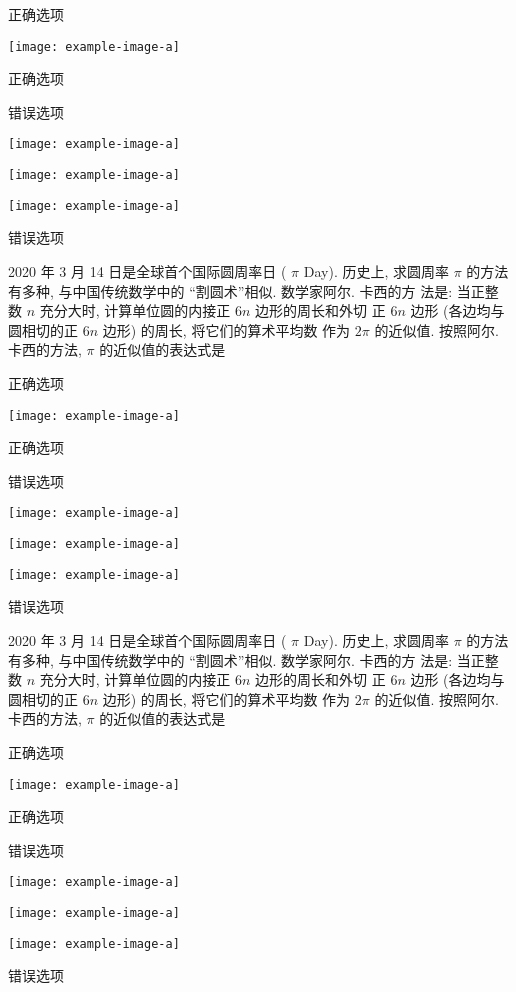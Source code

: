 \documentclass{ctexart}
\begin{document}
    \begin{xchoices}[mode = figure, items = 1]
      \item* 正确选项
      \item  \texttt{[image: example-image-a]}
      \item* 正确选项
      \item  错误选项
      \item  \texttt{[image: example-image-a]}
      \item  \texttt{[image: example-image-a]}
      \item  \texttt{[image: example-image-a]}
      \item  错误选项
    \end{xchoices}

    2020 年 3 月 14 日是全球首个国际圆周率日 ( $\pi$ Day). 历史上, 求圆周率 $\pi$ 的方法有多种, 与中国传统数学中的 “割圆术”相似. 数学家阿尔. 卡西的方 法是: 当正整数 $n$ 充分大时, 计算单位圆的内接正 $6 n$ 边形的周长和外切 正 $6 n$ 边形 (各边均与圆相切的正 $6 n$ 边形) 的周长, 将它们的算术平均数 作为 $2 \pi$ 的近似值. 按照阿尔. 卡西的方法, $\pi$ 的近似值的表达式是 \paren

    \begin{xchoices}[mode = figure, items = 2]
      \item* 正确选项
      \item  \texttt{[image: example-image-a]}
      \item* 正确选项
      \item  错误选项
      \item  \texttt{[image: example-image-a]}
      \item  \texttt{[image: example-image-a]}
      \item  \texttt{[image: example-image-a]}
      \item  错误选项
    \end{xchoices}

    2020 年 3 月 14 日是全球首个国际圆周率日 ( $\pi$ Day). 历史上, 求圆周率 $\pi$ 的方法有多种, 与中国传统数学中的 “割圆术”相似. 数学家阿尔. 卡西的方 法是: 当正整数 $n$ 充分大时, 计算单位圆的内接正 $6 n$ 边形的周长和外切 正 $6 n$ 边形 (各边均与圆相切的正 $6 n$ 边形) 的周长, 将它们的算术平均数 作为 $2 \pi$ 的近似值. 按照阿尔. 卡西的方法, $\pi$ 的近似值的表达式是 \paren

    \begin{xchoices}[mode = figure, items = 3]
      \item* 正确选项
      \item  \texttt{[image: example-image-a]}
      \item* 正确选项
      \item  错误选项
      \item  \texttt{[image: example-image-a]}
      \item  \texttt{[image: example-image-a]}
      \item  \texttt{[image: example-image-a]}
      \item  错误选项
    \end{xchoices}
\end{document}
